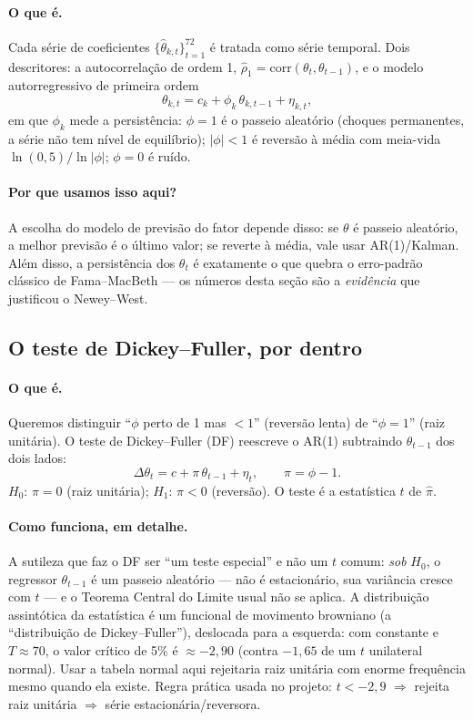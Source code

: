 \documentclass[11pt,a4paper]{article}
\newcommand{\porque}[0]{\paragraph{Por que usamos isso aqui?}}
\newcommand{\oquee}[0]{\paragraph{O que é.}}
\newcommand{\comofunciona}[0]{\paragraph{Como funciona, em detalhe.}}
\begin{document}
\oquee Cada série de coeficientes $\{\widehat\theta_{k,t}\}_{t=1}^{72}$ é tratada como série
temporal. Dois descritores: a autocorrelação de ordem 1, $\widehat\rho_1 =
\mathrm{corr}(\theta_t,\theta_{t-1})$, e o modelo autorregressivo de primeira ordem
\begin{equation}
\theta_{k,t} = c_k + \phi_k\,\theta_{k,t-1} + \eta_{k,t},
\end{equation}
em que $\phi_k$ mede a persistência: $\phi=1$ é o passeio aleatório (choques permanentes, a série
não tem nível de equilíbrio); $|\phi|<1$ é reversão à média com meia-vida
$\ln(0{,}5)/\ln|\phi|$; $\phi=0$ é ruído.

\porque A escolha do modelo de previsão do fator depende disso: se $\theta$ é passeio aleatório, a
melhor previsão é o último valor; se reverte à média, vale usar AR(1)/Kalman. Além disso, a
persistência dos $\theta_t$ é exatamente o que quebra o erro-padrão clássico de Fama--MacBeth ---
os números desta seção são a \emph{evidência} que justificou o Newey--West.

\subsection{O teste de Dickey--Fuller, por dentro}

\oquee Queremos distinguir ``$\phi$ perto de 1 mas $<1$'' (reversão lenta) de ``$\phi=1$'' (raiz
unitária). O teste de Dickey--Fuller (DF) reescreve o AR(1) subtraindo $\theta_{t-1}$ dos dois
lados:
\begin{equation}
\Delta\theta_t = c + \pi\,\theta_{t-1} + \eta_t, \qquad \pi = \phi-1 .
\end{equation}
$H_0$: $\pi=0$ (raiz unitária); $H_1$: $\pi<0$ (reversão). O teste é a estatística $t$ de
$\widehat\pi$.

\comofunciona A sutileza que faz o DF ser ``um teste especial'' e não um $t$ comum: \emph{sob}
$H_0$, o regressor $\theta_{t-1}$ é um passeio aleatório --- não é estacionário, sua variância
cresce com $t$ --- e o Teorema Central do Limite usual não se aplica. A distribuição assintótica
da estatística é um funcional de movimento browniano (a ``distribuição de Dickey--Fuller''),
deslocada para a esquerda: com constante e $T\approx70$, o valor crítico de 5\% é
$\approx-2{,}90$ (contra $-1{,}65$ de um $t$ unilateral normal). Usar a tabela normal aqui
rejeitaria raiz unitária com enorme frequência mesmo quando ela existe. Regra prática usada no
projeto: $t<-2{,}9$ $\Rightarrow$ rejeita raiz unitária $\Rightarrow$ série estacionária/reversora.
\end{document}
